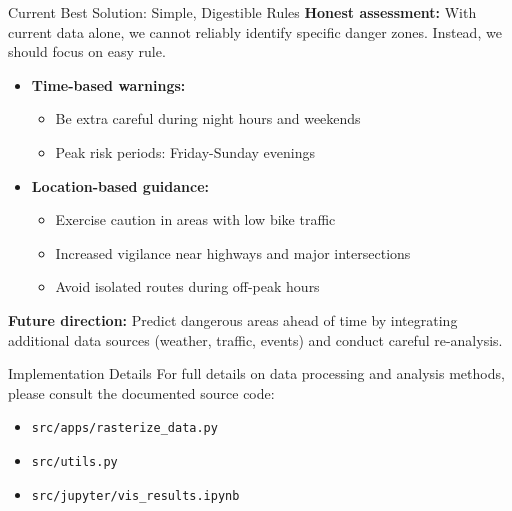\documentclass[aspectratio=169,xcolor={usenames,dvipsnames,svgnames,table},10pt,usepdftitle=false,hyperref={bookmarksdepth=3}]{beamer}
\begin{document}
\begin{frame}{Current Best Solution: Simple, Digestible Rules}
    \vspace{0.3cm}
    \textbf{Honest assessment:} With current data alone, we cannot reliably identify specific danger zones. Instead, we should focus on easy rule.\\
    \vspace{0.3cm}
    \begin{itemize}
        \item \textbf{Time-based warnings:}
        \begin{itemize}
            \item Be extra careful during night hours and weekends
            \item Peak risk periods: Friday-Sunday evenings
        \end{itemize}
        
        \item \textbf{Location-based guidance:}
        \begin{itemize}
            \item Exercise caution in areas with low bike traffic
            \item Increased vigilance near highways and major intersections
            \item Avoid isolated routes during off-peak hours
        \end{itemize}
    \end{itemize}
    
    \vspace{0.4cm}
    \textbf{Future direction:} Predict dangerous areas ahead of time by integrating additional data sources (weather, traffic, events) and conduct careful re-analysis.
\end{frame}


\begin{frame}{Implementation Details}
    For full details on data processing and analysis methods, please consult the documented source code:
    \begin{itemize}
        \item \texttt{src/apps/rasterize\_data.py}
        \item \texttt{src/utils.py}
        \item \texttt{src/jupyter/vis\_results.ipynb}
    \end{itemize}
\end{frame}
\end{document}
